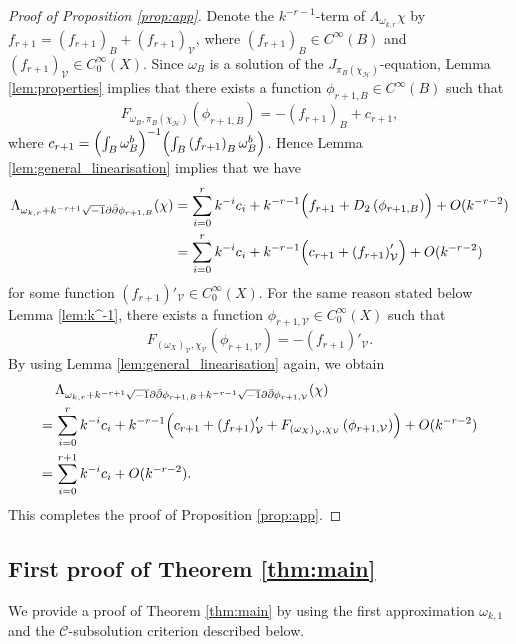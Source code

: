 \documentclass{amsart}
\numberwithin{equation}{section}
\theoremstyle{plain}
\theoremstyle{definition}
\theoremstyle{remark}
\begin{document}
\begin{proof}[Proof of Proposition \ref{prop:app}]
Denote the $k^{-r-1}$-term of $\Lambda_{\omega_{k,r}} \chi$ by $f_{r+1} = \left( f_{r+1} \right)_B + \left( f_{r+1} \right)_\mathcal{V}$, where $\left( f_{r+1} \right)_B \in C^\infty(B)$ and $\left( f_{r+1} \right)_\mathcal{V} \in C^\infty_0(X)$.
Since $\omega_B$ is a solution of the $J_{\pi_B(\chi_\mathcal{H})}$-equation, Lemma \ref{lem:properties} implies that there exists a function $\phi_{r+1,B} \in C^\infty(B)$ such that $$F_{\omega_B,\pi_B(\chi_\mathcal{H})} \left( \phi_{r+1,B} \right) 
= -\left( f_{r+1} \right)_B + c_{r+1},$$ 
where $c_{r+1} = \Bigl(\int_B \omega_B^b \Bigr)^{-1}\Bigl( \int_B \left( f_{r+1} \right)_B \omega_B^b \Bigr)$. Hence Lemma \ref{lem:general_linearisation} implies that  we have
\begin{align*}
\Lambda_{\omega_{k, r} + k^{-r+1} \sqrt{-1} \partial \bar{\partial} \phi_{r+1, B}} (\chi) 
&= \sum_{i=0}^r k^{-i} {c_i} + k^{-r-1} \Bigl( f_{r+1} + D_2 \left( \phi_{r+1, B} \right) \Bigr) + O(k^{-r-2}) \\
&= \sum_{i=0}^r k^{-i} {c_i} + k^{-r-1} \Bigl( c_{r+1} + \left( f_{r+1} \right)'_\mathcal{V} \Bigr) + O(k^{-r-2})
\end{align*}
for some function $ \left( f_{r+1}\right)'_\mathcal{V} \in C^\infty_0(X)$. 
For the same reason stated below Lemma \ref{lem:k^-1}, there exists a function $\phi_{r+1, \mathcal{V}} \in C^\infty_0(X)$ such that 
$$ F_{\left( \omega_X \right)_\mathcal{V}, \chi_\mathcal{V}} 
\left( \phi_{r+1, \mathcal{V}} \right) 
= - \left( f_{r+1}\right)'_\mathcal{V}.$$
By using Lemma \ref{lem:general_linearisation} again, we obtain 
\begin{align*}
&\, \Lambda_{\omega_{k, r} + k^{-r+1} \sqrt{-1} \partial \bar{\partial} \phi_{r+1, B} + k^{-r-1} \sqrt{-1} \partial \bar{\partial} \phi_{r+1, \mathcal{V}}} (\chi) \\
=& \,  \sum_{i=0}^r k^{-i} {c_i} + k^{-r-1} \Bigl( c_{r+1} + \left( f_{r+1} \right)'_\mathcal{V}  + F_{\left( \omega_X \right)_\mathcal{V}, \chi_\mathcal{V}} 
\left( \phi_{r+1, \mathcal{V}} \right) \Bigr) + O(k^{-r-2})\\
=& \, \sum_{i=0}^{r+1} k^{-i} {c_i} + O(k^{-r-2}).
\end{align*}
This completes the proof of Proposition \ref{prop:app}.
\end{proof}

\subsection{First proof of Theorem \ref{thm:main}}\label{sec:firstproof}
We provide a proof of Theorem \ref{thm:main} by using the first approximation $\omega_{k,1}$ and the $\mathcal{C}$-subsolution criterion described below.
\end{document}
